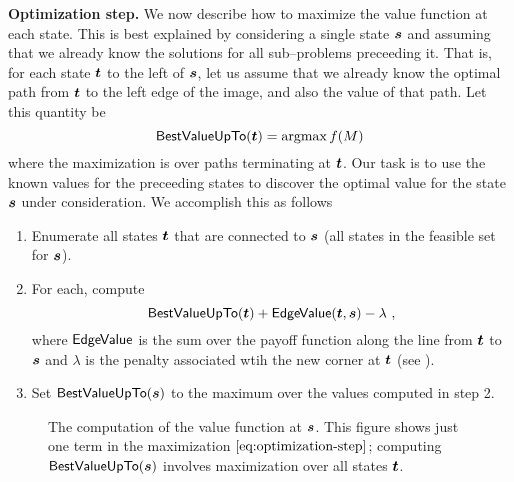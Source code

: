 \textbf{Optimization step.} We now describe how to maximize the value
function at each state. This is best explained by considering a single
state $\State$ and assuming that we already know the solutions for all
sub--problems preceeding it. That is, for each state $\OtherState$ to
the left of $\State$, let us assume that we already know the optimal
path from $\OtherState$ to the left edge of the image, and also the
value of that path. Let this quantity be
\begin{equation}
  \bestvalue(\OtherState) = \argmax \Objective(\Scene)
\end{equation}
where the maximization is over paths terminating at $\OtherState$. Our
task is to use the known values for the preceeding states to discover
the optimal value for the state $\State$ under consideration. We
accomplish this as follows
\begin{enumerate}
  \item{Enumerate all states $\OtherState$ that are connected to
    $\State$ (\ie all states in the feasible set for $\State$).}
  \item{For each, compute
    \begin{equation}
      \label{eq:optimization-step}
      \bestvalue(\OtherState)+\edgevalue(\OtherState,\State)-\lambda ~,
    \end{equation}
    where $\edgevalue$ is the sum over the payoff function along the
    line from $\OtherState$ to $\State$ and $\lambda$ is the penalty
    associated wtih the new corner at $\OtherState$ (see
    ).}
  \item{Set $\bestvalue(\State)$ to the maximum over the values
    computed in step 2.}
\end{enumerate}

\begin{figure}[tb]
  \centering
  \caption{The computation of the value function at $\State$. This
    figure shows just one term in the maximization
    $\eqnref{optimization-step}$; computing $\bestvalue(\State)$
    involves maximization over all states $\OtherState$.}
  \label{fig:recurrence-value}
\end{figure}

